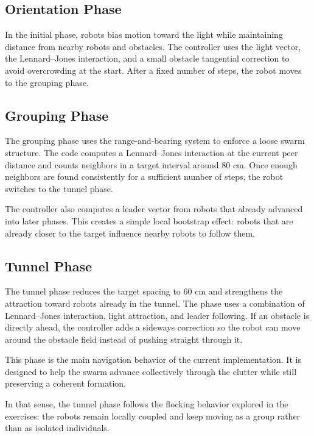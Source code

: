 \documentclass[runningheads]{llncs}
\begin{document}
\subsection{Orientation Phase}
In the initial phase, robots bias motion toward the light while maintaining
distance from nearby robots and obstacles. The controller uses the light
vector, the Lennard--Jones interaction, and a small obstacle tangential
correction to avoid overcrowding at the start. After a fixed number of steps,
the robot moves to the grouping phase.

\subsection{Grouping Phase}
The grouping phase uses the range-and-bearing system to enforce a loose swarm
structure. The code computes a Lennard--Jones interaction at the current peer
distance and counts neighbors in a target interval around 80 cm. Once enough
neighbors are found consistently for a sufficient number of steps, the robot
switches to the tunnel phase.

The controller also computes a leader vector from robots that already advanced
into later phases. This creates a simple local bootstrap effect: robots that are
already closer to the target influence nearby robots to follow them.

\subsection{Tunnel Phase}
The tunnel phase reduces the target spacing to 60 cm and strengthens the
attraction toward robots already in the tunnel. The phase uses a combination of
Lennard--Jones interaction, light attraction, and leader following. If an
obstacle is directly ahead, the controller adds a sideways correction so the
robot can move around the obstacle field instead of pushing straight through it.

This phase is the main navigation behavior of the current implementation. It is
designed to help the swarm advance collectively through the clutter while still
preserving a coherent formation.

In that sense, the tunnel phase follows the flocking behavior explored in the
exercises: the robots remain locally coupled and keep moving as a group rather
than as isolated individuals.
\end{document}
